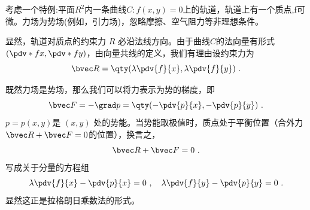 考虑一个特例:平面$R^2$内一条曲线$C:f(x,y)=0$上的轨道，轨道上有一个质点,f可微。力场为势场(例如，引力场)，忽略摩擦、空气阻力等非理想条件。

显然，轨道对质点的约束力 $R$ 必沿法线方向。由于曲线$C$的法向量有形式 $(\pdv*{f}{x},\pdv*{f}{y})$，由向量共线的定义，我们有理由设约束力为
\begin{equation}
\bvec R = \qty(\lambda\pdv{f}{x},\lambda\pdv{f}{y})~.
\end{equation}

既然力场是势场，那么我们可以将力表示为势的梯度，即
\begin{equation}
\bvec F = -\grad p = \qty(-\pdv{p}{x},-\pdv{p}{y})~.
\end{equation}
$p=p(x,y)$是 $(x,y)$ 处的势能。当势能取极值时，质点处于平衡位置（合外力$\bvec R+\bvec F=0$的位置），换言之，
\begin{equation}
\bvec R + \bvec F = 0 ~.
\end{equation}
写成关于分量的方程组
\begin{equation}
\lambda\pdv{f}{x}  -\pdv{p}{x} = 0~, \quad
\lambda\pdv{f}{y}  -\pdv{p}{y} = 0 ~.
\end{equation}
显然这正是拉格朗日乘数法的形式。
